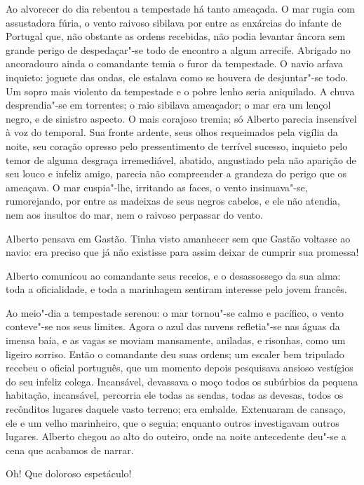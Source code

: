 Ao alvorecer do dia rebentou a tempestade há tanto ameaçada. O mar rugia
com assustadora fúria, o vento raivoso sibilava por entre as enxárcias
do infante de Portugal que, não obstante as ordens recebidas, não podia
levantar âncora sem grande perigo de despedaçar"-se todo de encontro a
algum arrecife. Abrigado no ancoradouro ainda o comandante temia o furor
da tempestade. O navio arfava inquieto: joguete das ondas, ele estalava
como se houvera de desjuntar"-se todo. Um sopro mais violento da
tempestade e o pobre lenho seria aniquilado. A chuva desprendia"-se em
torrentes; o raio sibilava ameaçador; o mar era um lençol negro, e de
sinistro aspecto. O mais corajoso tremia; só Alberto parecia insensível
à voz do temporal. Sua fronte ardente, seus olhos requeimados pela
vigília da noite, seu coração opresso pelo pressentimento de terrível
sucesso, inquieto pelo temor de alguma desgraça irremediável, abatido,
angustiado pela não aparição de seu louco e infeliz amigo, parecia não
compreender a grandeza do perigo que os ameaçava. O mar cuspia"-lhe,
irritando as faces, o vento insinuava"-se, rumorejando, por entre as
madeixas de seus negros cabelos, e ele não atendia, nem aos insultos do
mar, nem o raivoso perpassar do vento.

Alberto pensava em Gastão. Tinha visto amanhecer sem que Gastão voltasse
ao navio: era preciso que já não existisse para assim deixar de cumprir
sua promessa!

Alberto comunicou ao comandante seus receios, e o desassossego da sua
alma: toda a oficialidade, e toda a marinhagem sentiram interesse pelo
jovem francês.

Ao meio"-dia a tempestade serenou: o mar tornou"-se calmo e pacífico, o
vento conteve"-se nos seus limites. Agora o azul das nuvens refletia"-se
nas águas da imensa baía, e as vagas se moviam mansamente, aniladas, e
risonhas, como um ligeiro sorriso. Então o comandante deu suas ordens;
um escaler bem tripulado recebeu o oficial português, que um momento
depois pesquisava ansioso vestígios do seu infeliz colega. Incansável,
devassava o moço todos os subúrbios da pequena habitação, incansável,
percorria ele todas as sendas, todas as devesas, todos os recônditos
lugares daquele vasto terreno; era embalde. Extenuaram de cansaço, ele e
um velho marinheiro, que o seguia; enquanto outros investigavam outros
lugares. Alberto chegou ao alto do outeiro, onde na noite antecedente
deu"-se a cena que acabamos de narrar.

Oh! Que doloroso espetáculo!

